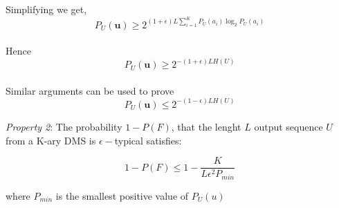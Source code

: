 \documentclass[11pt]{article}
\begin{document}
Simplifying we get,
\begin{equation}
P_{U}(\textbf{u}) \geq 2^{(1+\epsilon) L \sum\limits_{i=1}^KP_{U}(a_{i})\log_{2}P_{U}(a_{i})}
\end{equation}
\\

Hence
\begin{equation}
P_{U}(\textbf{u}) \geq 2^{-(1+\epsilon)LH(U)}
\end{equation}
\\

Similar arguments can be used to prove
\begin{equation}
P_{U}(\textbf{u}) \leq 2^{-(1-\epsilon)LH(U)}
\end{equation}


\textit{Property 2}: The probability $1 - P(F)$, that the lenght $L$ output sequence $U$ from a K-ary DMS is $\epsilon-$typical satisfies:

\begin{equation}
1 - P(F) \leq 1 - \frac{K}{L\epsilon^{2}P_{min}}
\end{equation}

where $P_{min}$ is the smallest positive value of $P_{U}(u)$
\end{document}
